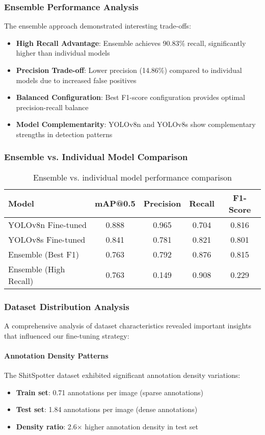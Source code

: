 \documentclass[12pt,a4paper]{article}
\begin{document}
\subsubsection{Ensemble Performance Analysis}
The ensemble approach demonstrated interesting trade-offs:
\begin{itemize}
    \item \textbf{High Recall Advantage}: Ensemble achieves 90.83\% recall, significantly higher than individual models
    \item \textbf{Precision Trade-off}: Lower precision (14.86\%) compared to individual models due to increased false positives
    \item \textbf{Balanced Configuration}: Best F1-score configuration provides optimal precision-recall balance
    \item \textbf{Model Complementarity}: YOLOv8n and YOLOv8s show complementary strengths in detection patterns
\end{itemize}

\subsubsection{Ensemble vs. Individual Model Comparison}
\begin{table}[H]
\centering
\begin{tabular}{lcccc}
\toprule
\textbf{Model} & \textbf{mAP@0.5} & \textbf{Precision} & \textbf{Recall} & \textbf{F1-Score} \\
\midrule
YOLOv8n Fine-tuned & 0.888 & 0.965 & 0.704 & 0.816 \\
YOLOv8s Fine-tuned & 0.841 & 0.781 & 0.821 & 0.801 \\
Ensemble (Best F1) & 0.763 & 0.792 & 0.876 & 0.815 \\
Ensemble (High Recall) & 0.763 & 0.149 & 0.908 & 0.229 \\
\bottomrule
\end{tabular}
\caption{Ensemble vs. individual model performance comparison}
\label{tab:ensemble_comparison}
\end{table}

\subsubsection{Dataset Distribution Analysis}
A comprehensive analysis of dataset characteristics revealed important insights that influenced our fine-tuning strategy:

\paragraph{Annotation Density Patterns}
The ShitSpotter dataset exhibited significant annotation density variations:
\begin{itemize}
    \item \textbf{Train set}: 0.71 annotations per image (sparse annotations)
    \item \textbf{Test set}: 1.84 annotations per image (dense annotations)
    \item \textbf{Density ratio}: 2.6× higher annotation density in test set
\end{itemize}
\end{document}

